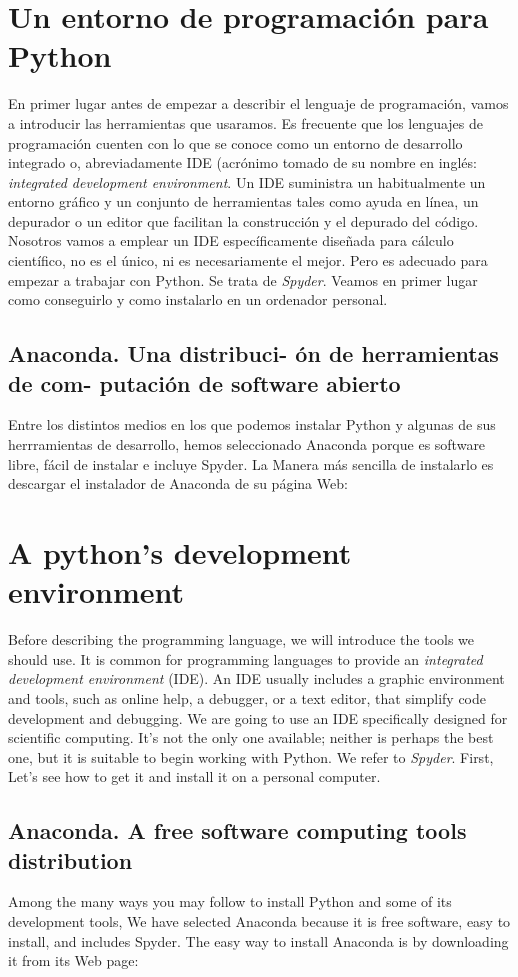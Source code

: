 \begin{paracol}{2}
\section{Un entorno de programación para Python}
En primer lugar antes de empezar a describir el lenguaje de programación, vamos a introducir las herramientas  que usaramos. Es frecuente que los lenguajes de programación cuenten con lo que se conoce como un entorno de desarrollo integrado o, abreviadamente IDE (acrónimo tomado de su nombre en inglés: \emph{integrated development environment}. Un IDE suministra un habitualmente un entorno gráfico y un conjunto de herramientas tales como ayuda en línea, un depurador o un editor que facilitan la construcción y el depurado del código. Nosotros vamos a emplear un IDE específicamente diseñada para cálculo científico, no es el único, ni es necesariamente el mejor. Pero es adecuado para empezar a trabajar con Python. Se trata de \emph{Spyder}. Veamos en primer lugar como conseguirlo y como instalarlo en un ordenador personal.

\subsection{Anaconda. Una distribuci- ón de herramientas de com- putación de software abierto}
Entre los distintos medios en los que podemos instalar Python y algunas de sus herrramientas de desarrollo, hemos seleccionado Anaconda porque es software libre, fácil de instalar e incluye Spyder. La Manera más sencilla de instalarlo es descargar el instalador de Anaconda de su página Web: 
\switchcolumn
\section{A python's development environment}
Before describing the programming language, we will introduce the tools we should use. It is common for programming languages to provide an \emph{integrated development environment} (IDE). An IDE usually includes a graphic environment and tools, such as online help,  a debugger, or a text editor, that simplify code development and debugging. We are going to use an IDE specifically designed for scientific computing. It's not the only one available; neither is perhaps the best one, but it is suitable to begin working with Python. We refer to \emph{Spyder}. First, Let's see how to get it and install it on a personal computer.

\subsection{Anaconda. A free software computing tools distribution}
Among the many ways you may follow to install Python and some of its development tools, We have selected Anaconda because it is free software, easy to install, and includes Spyder. The easy way to install Anaconda is by downloading it from its Web page:  
\end{paracol}
